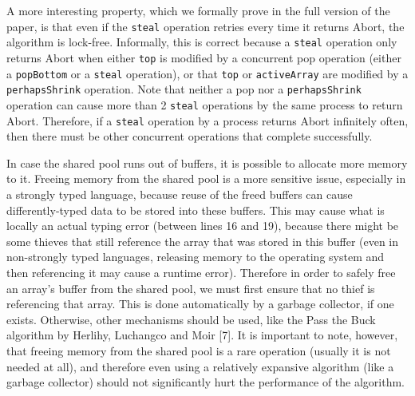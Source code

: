 A more interesting property, which we formally prove in the full
version of the paper, is that even if the \lstinline!steal! operation
retries every time it returns Abort, the algorithm is
lock-free. Informally, this is correct because a \lstinline!steal!
operation only returns Abort when either \lstinline!top! is modified
by a concurrent pop operation (either a \lstinline!popBottom! or a
\lstinline!steal! operation), or that \lstinline!top! or
\lstinline!activeArray!  are modified by a \lstinline!perhapsShrink!
operation. Note that neither a pop nor a \lstinline!perhapsShrink!
operation can cause more than 2 \lstinline!steal! operations by the
same process to return Abort. Therefore, if a \lstinline!steal!
operation by a process returns Abort infinitely often, then there must
be other concurrent operations that complete successfully.


In case the shared pool runs out of buffers, it is possible to
allocate more memory to it. Freeing memory from the shared pool is a
more sensitive issue, especially in a strongly typed language, because
reuse of the freed buffers can cause differently-typed data to be
stored into these buffers. This may cause what is locally an actual
typing error (between lines 16 and 19), because there might be some
thieves that still reference the array that was stored in this buffer
(even in non-strongly typed languages, releasing memory to the
operating system and then referencing it may cause a runtime
error). Therefore in order to safely free an array's buffer from the
shared pool, we must first ensure that no thief is referencing that
array. This is done automatically by a garbage collector, if one
exists. Otherwise, other mechanisms should be used, like the Pass the
Buck algorithm by Herlihy, Luchangco and Moir [7]. It is important to
note, however, that freeing memory from the shared pool is a rare
operation (usually it is not needed at all), and therefore even using
a relatively expansive algorithm (like a garbage collector) should not
significantly hurt the performance of the algorithm.



